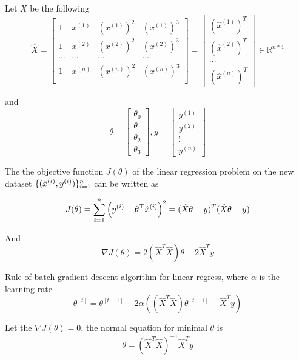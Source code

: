 \begin{answer}

Let $X$ be the following
\begin{equation*}
	\hat{X} = \left[\begin{matrix}
	    1 & x^{(1)} & (x^{(1)})^2 & (x^{(1)})^3 \\
            1 & x^{(2)} & (x^{(2)})^2 & (x^{(2)})^3 \\
            \cdots & \cdots & \cdots & \cdots \\
            1 & x^{(n)} & (x^{(n)})^2 & (x^{(n)})^3 \\
	\end{matrix} \right] = \left[\begin{matrix} (\hat{x}^{(1)})^T \\ (\hat{x}^{(2)})^T \\ 
 \cdots \\ (\hat{x}^{(n)})^T  \end{matrix} \right] \in  
 \mathbb{R}^{n*4}
\end{equation*}

and 
\begin{equation*}
	\theta = \left[\begin{array}{c} \theta_0\\ \theta_1 \\ \theta_2 \\ \theta_3 \end{array}\right],  y = \left[\begin{array}{c} y^{(1)} \\ y^{(2)}\\ \vdots \\ y^{(n)} \end{array}\right]
\end{equation*}

The the objective function $J(\theta)$ of the linear regression problem on the new dataset $\{(\hat{x}^{(i)}, y^{(i)})\}_{i=1}^{{n}}$ can be written as 

\begin{equation*}
	J(\theta) = \sum_{i=1}^{n} \left( y^{(i)} - \theta ^\top \hat{x}^{(i)}\right) ^ 2 = (\hat{X} \theta - y)^T(\hat{X} \theta - y)
\end{equation*}

And 
\begin{equation*}
    \nabla J(\theta) = 2(\hat{X}^T\hat{X})\theta - 2 \hat{X}^Ty 
\end{equation*}

Rule of batch gradient descent algorithm for linear regress, where $\alpha$ is the learning rate
\begin{equation*}
	\theta^{[t]} = \theta^{[t-1]} - 2\alpha \left((\hat{X}^T\hat{X})\theta^{[t-1]} -  \hat{X}^Ty\right)
\end{equation*}

Let the $\nabla J(\theta) = 0$, the normal equation for minimal $\theta$ is 
\begin{equation*}
	\theta = (\hat{X}^T\hat{X})^{-1} \hat{X}^Ty
\end{equation*}

\end{answer}
